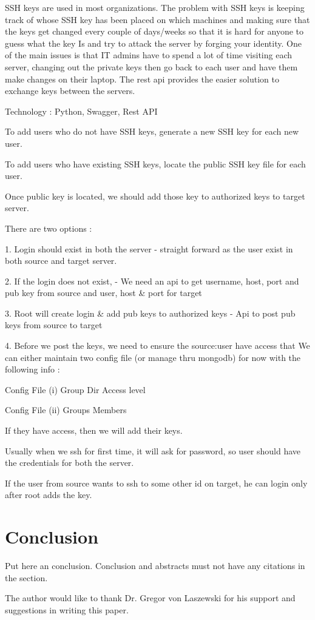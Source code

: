 \documentclass[sigconf]{acmart}
\begin{document}
SSH keys are used in most organizations. The problem with SSH keys is keeping 
track of whose SSH key has been placed on which machines and making sure that 
the keys get changed every couple of days/weeks so that it is hard for anyone 
to guess what the key Is and try to attack the server by forging your identity.
One of the main issues is that IT admins have to spend a lot of time visiting 
each server, changing out the private keys then go back to each user and have 
them make changes on their laptop. The rest api provides the easier solution to
exchange keys between the servers.

Technology : Python, Swagger, Rest API

To add users who do not have SSH keys, generate a new SSH key for each new user.

To add users who have existing SSH keys, locate the public SSH key file for each user.

Once public key is located, we should add those key to authorized keys 
to target server.

There are two options :

1. Login should exist in both the server - straight forward as the user exist 
         in both source and target server.

2. If the login does not exist,
        - We need an api to get username, host, port and pub key from source
            and user, host & port for target
        
3. Root will create login & add pub keys to authorized keys
	- Api to post pub keys from source to target

4. Before we post the keys, we need to ensure the source:user have access that
   We can either maintain two config file (or manage thru mongodb) for now with the following info :

  Config File (i)  Group   Dir        Access level

  Config File (ii) Groups    Members
 
If they have access, then we will add their keys.

Usually when we ssh for first time, it will ask for password, so user should have the credentials for both
the server.

If the user from source wants to ssh to some other id on target, he can login only after root adds the key.


\section{Conclusion}

Put here an conclusion. Conclusion and abstracts must not have any
citations in the section.


\begin{acks}
The author would like to thank Dr. Gregor von Laszewski for his support and 
suggestions in writing this paper.
\end{acks}



\end{document}

